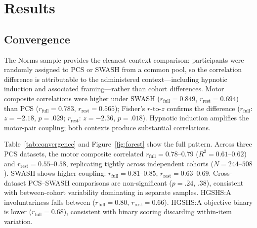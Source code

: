\documentclass[12pt,a4paper]{article}
\begin{document}
\section{Results}

\subsection{Convergence}

The Norms sample provides the cleanest context comparison: participants were
randomly assigned to PCS or SWASH from a common pool, so the correlation
difference is attributable to the administered context---including hypnotic
induction and associated framing---rather than cohort differences. Motor composite
correlations were higher under SWASH ($r_{\text{full}} = 0.849$,
$r_{\text{rest}} = 0.694$) than PCS ($r_{\text{full}} = 0.783$,
$r_{\text{rest}} = 0.565$); Fisher's $r$-to-$z$ confirms the difference
($r_{\text{full}}$: $z = -2.18$, $p = .029$; $r_{\text{rest}}$: $z = -2.36$,
$p = .018$). Hypnotic induction amplifies the motor-pair coupling; both
contexts produce substantial correlations.

Table~\ref{tab:convergence} and Figure~\ref{fig:forest} show the full
pattern. Across three PCS datasets, the motor composite correlated
$r_{\text{full}} = 0.78$--$0.79$ ($R^2 = 0.61$--$0.62$) and
$r_{\text{rest}} = 0.55$--$0.58$, replicating tightly across independent
cohorts ($N = 244$--$508$). SWASH shows higher coupling: $r_{\text{full}} =
0.81$--$0.85$, $r_{\text{rest}} = 0.63$--$0.69$. Cross-dataset PCS--SWASH
comparisons are non-significant ($p = .24$, $.38$), consistent with
between-cohort variability dominating in separate samples. HGSHS:A
involuntariness falls between ($r_{\text{full}} = 0.80$, $r_{\text{rest}} =
0.66$). HGSHS:A objective binary is lower ($r_{\text{full}} = 0.68$),
consistent with binary scoring discarding within-item variation.
\end{document}
